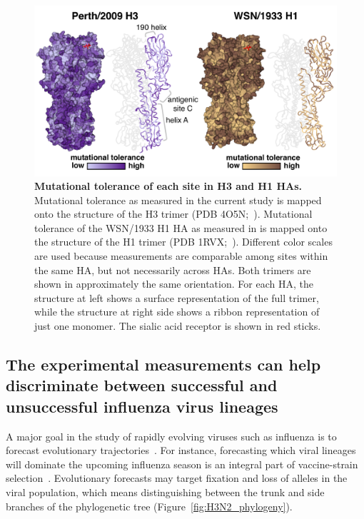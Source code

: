 \documentclass[9pt,twocolumn,twoside]{pnas-new}
\begin{document}
\begin{figure}
\centering
\includegraphics[width=\columnwidth]{figs/mut_tolerance/entropy_heatmap.pdf}
\caption{\label{fig:mut_tolerance}
{\bf Mutational tolerance of each site in H3 and H1 HAs.}
Mutational tolerance as measured in the current study is mapped onto the structure of the H3 trimer (PDB 4O5N;~\cite{lee2014receptor}).
Mutational tolerance of the WSN/1933 H1 HA as measured in \cite{doud2016accurate} is mapped onto the structure of the H1 trimer (PDB 1RVX;~\cite{gamblin2004structure}).
Different color scales are used because measurements are comparable among sites within the same HA, but not necessarily across HAs.
Both trimers are shown in approximately the same orientation. 
For each HA, the structure at left shows a surface representation of the full trimer, while the structure at right side shows a ribbon representation of just one monomer.
The sialic acid receptor is shown in red sticks.
}
\end{figure}

\subsection*{The experimental measurements can help discriminate between successful and unsuccessful influenza virus lineages}
A major goal in the study of rapidly evolving viruses such as influenza is to forecast evolutionary trajectories~\cite{lassig2017predicting,morris2017predictive}.
For instance, forecasting which viral lineages will dominate the upcoming influenza season is an integral part of vaccine-strain selection~\cite{neher2015nextflu,lassig2017predicting,morris2017predictive}.
Evolutionary forecasts may target fixation and loss of alleles in the viral population, which means distinguishing between the trunk and side branches of the phylogenetic tree (Figure~\ref{fig:H3N2_phylogeny}).
\end{document}
